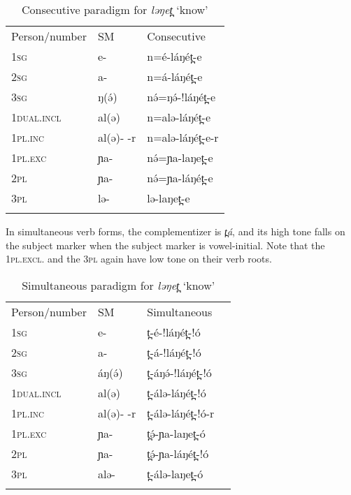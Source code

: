 \begin{table}
	\begin{tabular}[t]{lll}
	\lsptoprule
Person/number 	& 	SM  & 	Consecutive	\\ 
1\textsc{sg}				&	e- 	&	n=é-láŋét̪-e  \\
2\textsc{sg} 			&	a- 	&	n=á-láŋét̪-e\\
3\textsc{sg}				&  ŋ(ə́) 	&	nə́=ŋə́-!láŋét̪-e\\
1\textsc{dual.incl}		&	al(ə)  	&	n=alə-láŋét̪-e\\
1\textsc{pl.inc}			&	al(ə)- -r& 	n=alə-láŋét̪-e-r\\
1\textsc{pl.exc}			&	ɲa-  	&	nə́=ɲa-laŋet̪-e\\
2\textsc{pl}				&	ɲa-  	&	nə́=ɲa-láŋét̪-e\\
3\textsc{pl} 			&	lə- 	&	lə-laŋet̪-e\\
	\lspbottomrule
	\end{tabular}
	\caption{Consecutive paradigm for \textit{ləŋet̪} `know'}
	\label{tab:ch11:agr4} 
\end{table} %

In simultaneous verb forms, the complementizer is \textit{t̪á}, and its high tone falls on the subject marker when the subject marker is vowel-initial. Note that the 1\textsc{pl.excl}. and the 3\textsc{pl} again have low tone on their verb roots.  

\begin{table}
	\begin{supertabular}[t]{llll}
	\lsptoprule
Person/number &	SM 	&	Simultaneous \\
1\textsc{sg}			&	e- 	&	t̪-é-!láŋét̪-!ó  \\
2\textsc{sg} 		&	a- 	&	t̪-á-!láŋét̪-!ó  \\
3\textsc{sg}			&	áŋ(ə́) 	&	t̪-áŋə́-!láŋét̪-!ó  \\
1\textsc{dual.incl}	&	al(ə)  	&	t̪-álə-láŋét̪-!ó  \\
1\textsc{pl.inc}		&	al(ə)- -r& 	t̪-álə-láŋét̪-!ó-r  \\
1\textsc{pl.exc}		&	ɲa-  	&	t̪ə́-ɲa-laŋet̪-ó  \\
2\textsc{pl}			&	ɲa-  	&	t̪ə́-ɲa-láŋét̪-!ó  \\
3\textsc{pl} 		&	alə- 	&	t̪-álə-laŋet̪-ó  \\
	\lspbottomrule
	\end{supertabular}
	\caption{Simultaneous paradigm for \textit{ləŋet̪} `know'}
	\label{tab:ch11:agr5}
\end{table}


